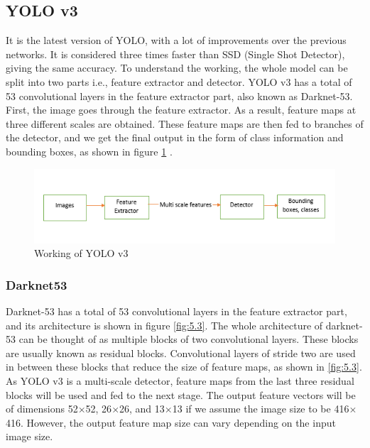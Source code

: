   \subsection{YOLO v3}
  It is the latest version of YOLO, with a lot of improvements over the previous networks. It is considered three times faster than SSD (Single Shot Detector), giving the same accuracy. To understand the working, the whole model can be split into two parts i.e., feature extractor and detector. YOLO v3 has a total of 53 convolutional layers in the feature extractor part, also known as Darknet-53. First, the image goes through the feature extractor. As a result, feature maps at three different scales are obtained. These feature maps are then fed to branches of the detector, and we get the final output in the form of class information and bounding boxes, as shown in figure \ref{fig:5.2} \cite{chap_5_article:3}.
  \begin{figure}[H]
    \centering
    \captionsetup{justification = centering}
    \includegraphics[scale= 1]{CHAPTERS/Chapter-5/images/5.2.png}
    \caption{Working of YOLO v3 } 
    \label{fig:5.2}
  \end{figure}
  \subsubsection*{Darknet53}
    Darknet-53 has a total of 53 convolutional layers in the feature extractor part, and its architecture is shown in figure \ref{fig:5.3}. The whole architecture of darknet-53 can be thought of as multiple blocks of two convolutional layers. These blocks are usually known as residual blocks. Convolutional layers of stride two are used in between these blocks that reduce the size of feature maps, as shown in \ref{fig:5.3}. As YOLO v3 is a multi-scale detector, feature maps from the last three residual blocks will be used and fed to the next stage. The output feature vectors will be of dimensions 52$\times$52, 26$\times$26, and 13$\times$13 if we assume the image size to be 416$\times$416. However, the output feature map size can vary depending on the input image size.
